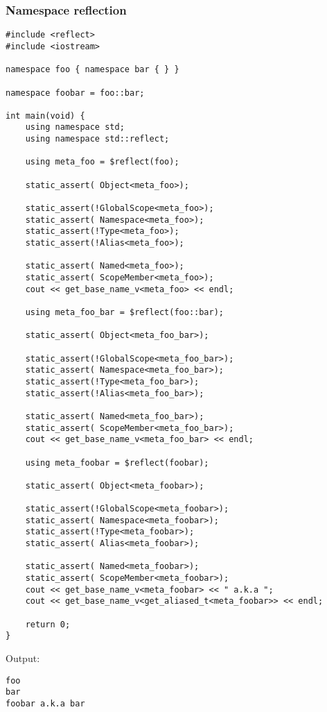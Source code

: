 \subsubsection{Namespace reflection}

\begin{verbatim}
#include <reflect>
#include <iostream>

namespace foo { namespace bar { } }

namespace foobar = foo::bar;

int main(void) {
	using namespace std;
	using namespace std::reflect;

	using meta_foo = $reflect(foo);

	static_assert( Object<meta_foo>);

	static_assert(!GlobalScope<meta_foo>);
	static_assert( Namespace<meta_foo>);
	static_assert(!Type<meta_foo>);
	static_assert(!Alias<meta_foo>);

	static_assert( Named<meta_foo>);
	static_assert( ScopeMember<meta_foo>);
	cout << get_base_name_v<meta_foo> << endl;

	using meta_foo_bar = $reflect(foo::bar);

	static_assert( Object<meta_foo_bar>);

	static_assert(!GlobalScope<meta_foo_bar>);
	static_assert( Namespace<meta_foo_bar>);
	static_assert(!Type<meta_foo_bar>);
	static_assert(!Alias<meta_foo_bar>);

	static_assert( Named<meta_foo_bar>);
	static_assert( ScopeMember<meta_foo_bar>);
	cout << get_base_name_v<meta_foo_bar> << endl;

	using meta_foobar = $reflect(foobar);

	static_assert( Object<meta_foobar>);

	static_assert(!GlobalScope<meta_foobar>);
	static_assert( Namespace<meta_foobar>);
	static_assert(!Type<meta_foobar>);
	static_assert( Alias<meta_foobar>);

	static_assert( Named<meta_foobar>);
	static_assert( ScopeMember<meta_foobar>);
	cout << get_base_name_v<meta_foobar> << " a.k.a ";
	cout << get_base_name_v<get_aliased_t<meta_foobar>> << endl;

	return 0;
}
\end{verbatim}

Output:

\begin{verbatim}
foo
bar
foobar a.k.a bar
\end{verbatim}


